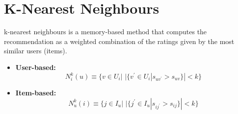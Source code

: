 \section{K-Nearest Neighbours}
k-nearest neighbours is a memory-based method that computes the recommendation as a weighted combination of the ratings given by the most similar users (items).
\begin{itemize}
    \item \textbf{User-based:}
    \[N^{k}_{i}(u) \equiv \{v \in U_{i} | \,\, |\{v^{'} \in U_{i}| s_{uv^{'}} > s_{uv}\}| < k\}\]

    \item \textbf{Item-based:}
    \[N^{k}_{u}(i) \equiv \{j \in I_{u} | \,\, |\{j^{'} \in I_{u}| s_{ij^{'}} > s_{ij}\}| < k\}\]
\end{itemize}

